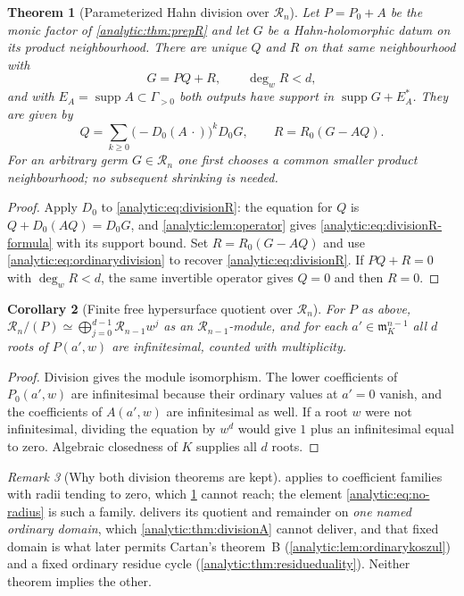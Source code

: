 \documentclass[11pt,letterpaper]{article}
\newtheorem{theorem}{Theorem}[section]
\newtheorem{corollary}[theorem]{Corollary}
\theoremstyle{definition}
\theoremstyle{remark}
\newtheorem{remark}[theorem]{Remark}
\newcommand{\RR}{\mathscr R}
\newcommand{\m}{\mathfrak m}
\newcommand{\supp}{\operatorname{supp}}
\numberwithin{equation}{section}
\begin{document}
\begin{theorem}[Parameterized Hahn division over $\RR_n$]
\label{analytic:thm:divisionR}
Let $P=P_0+A$ be the monic factor of \cref{analytic:thm:prepR} and let $G$
be a Hahn-holomorphic datum on its product neighbourhood. There are unique
$Q$ and $R$ on that same neighbourhood with
\begin{equation}\label{analytic:eq:divisionR}
 G=PQ+R,\qquad\deg_wR<d,
\end{equation}
and with $E_A=\supp A\subset\Gamma_{>0}$ both outputs have support in
$\supp G+E_A^*$. They are given by
\begin{equation}\label{analytic:eq:divisionR-formula}
 Q=\sum_{k\ge0}\bigl(-D_0(A\,\cdot)\bigr)^kD_0G,
 \qquad R=R_0(G-AQ).
\end{equation}
For an arbitrary germ $G\in\RR_n$ one first chooses a common smaller
product neighbourhood; no subsequent shrinking is needed.
\end{theorem}
\begin{proof}
Apply $D_0$ to \eqref{analytic:eq:divisionR}: the equation for $Q$ is
$Q+D_0(AQ)=D_0G$, and \cref{analytic:lem:operator} gives
\eqref{analytic:eq:divisionR-formula} with its support bound. Set
$R=R_0(G-AQ)$ and use \eqref{analytic:eq:ordinarydivision} to recover
\eqref{analytic:eq:divisionR}. If $PQ+R=0$ with $\deg_wR<d$, the same
invertible operator gives $Q=0$ and then $R=0$.
\end{proof}

\begin{corollary}[Finite free hypersurface quotient over $\RR_n$]
\label{analytic:cor:freehypersurfaceR}
For $P$ as above,
$\RR_n/(P)\simeq\bigoplus_{j=0}^{d-1}\RR_{n-1}w^j$ as an
$\RR_{n-1}$-module, and for each $a'\in\m_K^{n-1}$ all $d$ roots of
$P(a',w)$ are infinitesimal, counted with multiplicity.
\end{corollary}
\begin{proof}
Division gives the module isomorphism. The lower coefficients of
$P_0(a',w)$ are infinitesimal because their ordinary values at $a'=0$
vanish, and the coefficients of $A(a',w)$ are infinitesimal as well. If a
root $w$ were not infinitesimal, dividing the equation by $w^d$ would give
$1$ plus an infinitesimal equal to zero. Algebraic closedness of $K$
supplies all $d$ roots.
\end{proof}

\begin{remark}[Why both division theorems are kept]
\label{analytic:rem:two-divisions}
 applies to coefficient families with radii
tending to zero, which \cref{analytic:thm:divisionR} cannot reach; the
element \eqref{analytic:eq:no-radius} is such a family.
 delivers its quotient and remainder on
\emph{one named ordinary domain}, which \cref{analytic:thm:divisionA}
cannot deliver, and that fixed domain is what later permits Cartan's
theorem~B (\cref{analytic:lem:ordinarykoszul}) and a fixed ordinary residue
cycle (\cref{analytic:thm:residueduality}). Neither theorem implies the
other.
\end{remark}
\end{document}
